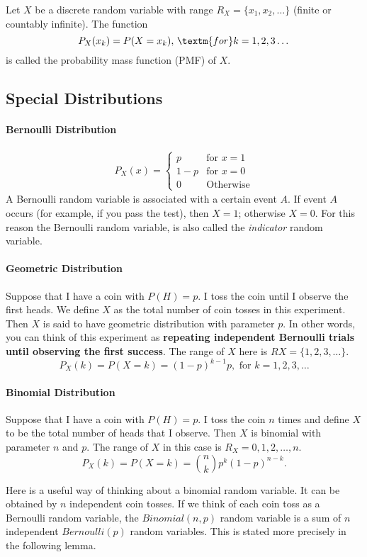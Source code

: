 Let $X$ be a discrete random variable with range $R_X=\{x_1,x_2,\dots\}$ (finite or countably infinite). The function
$$P_X(x_k)=P(X=x_k), \,\textm{for }k=1,2,3\dots $$
is called the probability mass function (PMF) of $X$. 

\subsection{Special Distributions}

\paragraph{Bernoulli Distribution}
\begin{align*}
	P_X(x) = \begin{cases}
	p & \text{for } x=1\\
	1-p & \text{for } x=0\\
	0 & \text{Otherwise}
\end{cases}
\end{align*}
A Bernoulli random variable is associated with a certain event $A$. If event $A$ occurs (for example, if you pass the test), then $X=1$; otherwise $X=0$. For this reason the Bernoulli random variable, is also called the \textit{indicator} random variable.


\paragraph{Geometric Distribution}
Suppose that I have a coin with $P(H)=p$. I toss the coin until I observe the first heads. We define $X$ as the total number of coin tosses in this experiment. Then $X$ is said to have geometric distribution with parameter $p$. In other words, you can think of this experiment as \textbf{repeating independent Bernoulli trials until observing the first success}. The range of $X$ here is $RX=\{1,2,3,\dots\}$. 
$$P_X(k) =P(X=k)=(1-p)^{k-1} p, \textrm{ for } k=1,2,3,\dots$$

\paragraph{Binomial Distribution}
Suppose that I have a coin with $P(H)=p$. I toss the coin $n$ times and define $X$ to be the total number of heads that I observe. Then $X$ is binomial with parameter $n$ and $p$. The range of $X$ in this case is $R_X={0,1,2,\dots,n}$. 
$$P_X(k) = P(X=k) =\binom{n}{k}p^k(1-p)^{n-k}.$$

Here is a useful way of thinking about a binomial random variable. It can be obtained by $n$ independent coin tosses. If we think of each coin toss as a Bernoulli random variable, the $Binomial(n,p)$ random variable is a sum of $n$ independent $Bernoulli(p)$ random variables. This is stated more precisely in the following lemma.

